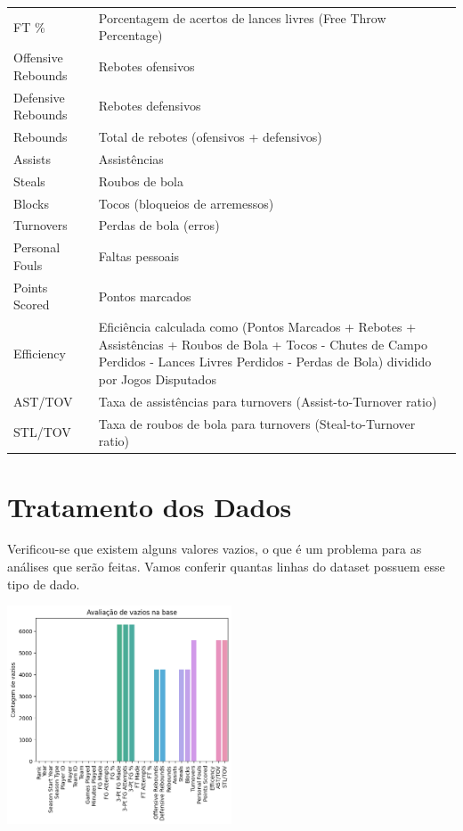 \documentclass[
]{book}
\begin{document}
\begin{longtable}[]{@{}
  >{\raggedright\arraybackslash}p{}
  >{\raggedright\arraybackslash}p{}@{}}
FT \% & Porcentagem de acertos de lances livres (Free Throw Percentage) \\
Offensive Rebounds & Rebotes ofensivos \\
Defensive Rebounds & Rebotes defensivos \\
Rebounds & Total de rebotes (ofensivos + defensivos) \\
Assists & Assistências \\
Steals & Roubos de bola \\
Blocks & Tocos (bloqueios de arremessos) \\
Turnovers & Perdas de bola (erros) \\
Personal Fouls & Faltas pessoais \\
Points Scored & Pontos marcados \\
Efficiency & Eficiência calculada como (Pontos Marcados + Rebotes + Assistências + Roubos de Bola + Tocos - Chutes de Campo Perdidos - Lances Livres Perdidos - Perdas de Bola) dividido por Jogos Disputados \\
AST/TOV & Taxa de assistências para turnovers (Assist-to-Turnover ratio) \\
STL/TOV & Taxa de roubos de bola para turnovers (Steal-to-Turnover ratio) \\
\bottomrule()
\end{longtable}

\hypertarget{tratamento-dos-dados}{%
\chapter{Tratamento dos Dados}\label{tratamento-dos-dados}}

Verificou-se que existem alguns valores vazios, o que é um problema para as análises que serão feitas. Vamos conferir quantas linhas do dataset possuem esse tipo de dado.

\includegraphics[width=0.5\textwidth,height=\textheight]{imagens/1.png}
\end{document}
